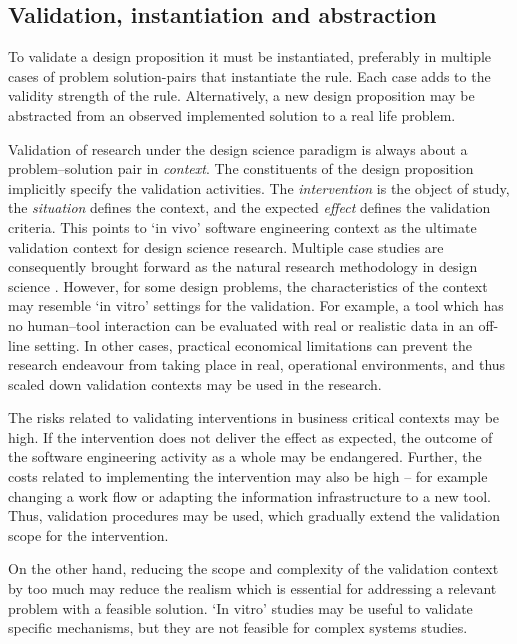 \documentclass[graybox]{svmult}
\begin{document}
\subsection{Validation, instantiation and abstraction}

To validate a design proposition it must be instantiated, preferably in multiple cases of problem solution-pairs that instantiate the rule. Each case adds to the validity strength of the rule. Alternatively,  a new design proposition may be abstracted from an observed implemented solution to a real life problem.

Validation of research under the design science paradigm is always about a problem--solution pair in \emph{context}. The constituents of the design proposition implicitly specify the validation activities. The \emph{intervention} is the object of study, the \emph{situation} defines the context, and the expected \emph{effect} defines the validation criteria. This points to `in vivo' software engineering context as the ultimate validation context for design science research. Multiple case studies are consequently brought forward as the natural research methodology in design science \cite{van_aken_management_2004}. However, for some design problems, the characteristics of the context may resemble `in vitro' settings for the validation. For example, a tool which has no human--tool interaction can be evaluated with real or realistic data in an off-line setting. In other cases, practical economical limitations can prevent the research endeavour from taking place in real, operational environments, and thus scaled down validation contexts may be used in the research. 

The risks related to validating interventions in business critical contexts may be high. If the intervention does not deliver the effect as expected, the outcome of the software engineering activity as a whole may be endangered. Further, the costs related to implementing the intervention may also be high -- for example changing a work flow or adapting the information infrastructure to a new tool. Thus, validation procedures may be used, which gradually extend the validation scope for the intervention.

On the other hand, reducing the scope and complexity of the validation context by too much may reduce the realism which is essential for addressing a relevant problem with a feasible solution. `In vitro' studies may be useful to validate specific mechanisms, but they are not feasible for complex systems studies.  
\end{document}
